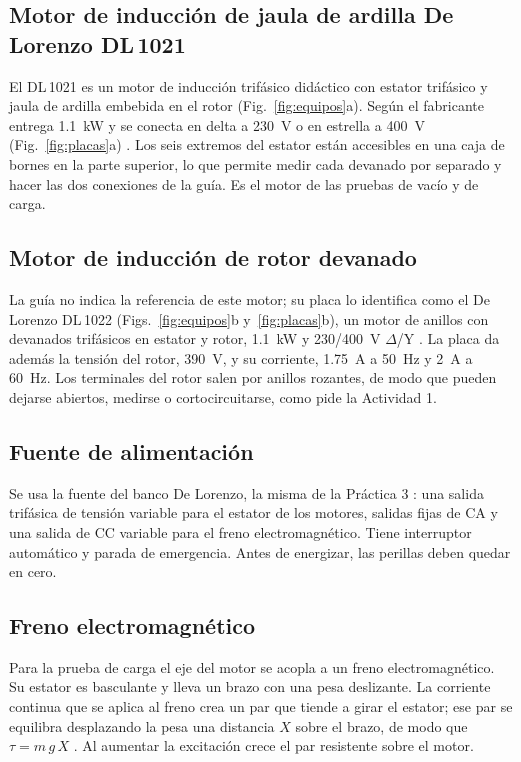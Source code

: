 \documentclass[conference]{IEEEtran}
\begin{document}
\subsection{Motor de inducción de jaula de ardilla De Lorenzo DL\,1021}
El DL\,1021 es un motor de inducción trifásico didáctico con estator trifásico y jaula de ardilla embebida en el rotor (Fig.~\ref{fig:equipos}a). Según el fabricante entrega \SI{1,1}{kW} y se conecta en delta a \SI{230}{V} o en estrella a \SI{400}{V} (Fig.~\ref{fig:placas}a) \cite{dl1021}. Los seis extremos del estator están accesibles en una caja de bornes en la parte superior, lo que permite medir cada devanado por separado y hacer las dos conexiones de la guía. Es el motor de las pruebas de vacío y de carga.

\subsection{Motor de inducción de rotor devanado}
La guía no indica la referencia de este motor; su placa lo identifica como el De Lorenzo DL\,1022 (Figs.~\ref{fig:equipos}b y~\ref{fig:placas}b), un motor de anillos con devanados trifásicos en estator y rotor, \SI{1,1}{kW} y \num{230}/\SI{400}{V} $\Delta$/Y \cite{dl1022}. La placa da además la tensión del rotor, \SI{390}{V}, y su corriente, \num{1,75}~A a \SI{50}{Hz} y \SI{2}{A} a \SI{60}{Hz}. Los terminales del rotor salen por anillos rozantes, de modo que pueden dejarse abiertos, medirse o cortocircuitarse, como pide la Actividad 1.

\subsection{Fuente de alimentación}
Se usa la fuente del banco De Lorenzo, la misma de la Práctica 3 \cite{lab3}: una salida trifásica de tensión variable para el estator de los motores, salidas fijas de CA y una salida de CC variable para el freno electromagnético. Tiene interruptor automático y parada de emergencia. Antes de energizar, las perillas deben quedar en cero.

\subsection{Freno electromagnético}
Para la prueba de carga el eje del motor se acopla a un freno electromagnético. Su estator es basculante y lleva un brazo con una pesa deslizante. La corriente continua que se aplica al freno crea un par que tiende a girar el estator; ese par se equilibra desplazando la pesa una distancia $X$ sobre el brazo, de modo que $\tau=m\,g\,X$ \cite{guia}. Al aumentar la excitación crece el par resistente sobre el motor.
\end{document}
